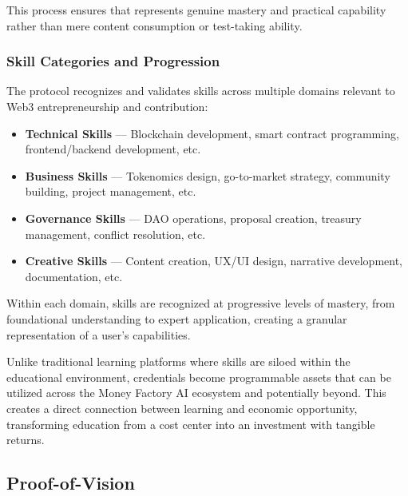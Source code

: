 This process ensures that  represents genuine mastery and practical capability rather than mere content consumption or test-taking ability.

\subsubsection*{Skill Categories and Progression}

The protocol recognizes and validates skills across multiple domains relevant to Web3 entrepreneurship and contribution:

\begin{itemize}
    \item \textbf{Technical Skills} — Blockchain development, smart contract programming, frontend/backend development, etc.
    
    \item \textbf{Business Skills} — Tokenomics design, go-to-market strategy, community building, project management, etc.
    
    \item \textbf{Governance Skills} — DAO operations, proposal creation, treasury management, conflict resolution, etc.
    
    \item \textbf{Creative Skills} — Content creation, UX/UI design, narrative development, documentation, etc.
\end{itemize}

Within each domain, skills are recognized at progressive levels of mastery, from foundational understanding to expert application, creating a granular representation of a user's capabilities.

\begin{mfai-note}
Unlike traditional learning platforms where skills are siloed within the educational environment,  credentials become programmable assets that can be utilized across the Money Factory AI ecosystem and potentially beyond. This creates a direct connection between learning and economic opportunity, transforming education from a cost center into an investment with tangible returns.
\end{mfai-note}

\subsection{Proof-of-Vision\texttrademark}

